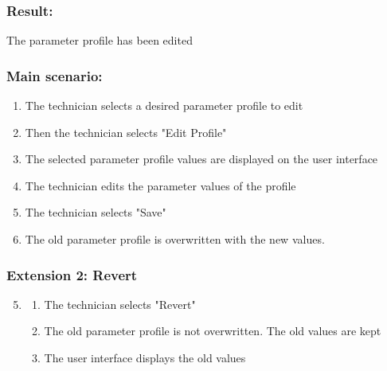 \begin{framed}
\subsubsection*{Result:}
The parameter profile has been edited

\subsubsection*{Main scenario:}
\begin{enumerate}
	\item The technician selects a desired parameter profile to edit
	\item Then the technician selects "Edit Profile"
	\item The selected parameter profile values are displayed on the user interface
	\item The technician edits the parameter values of the profile
	\item The technician selects "Save"
	\item The old parameter profile is overwritten with the new values.
\end{enumerate}	

\subsubsection*{Extension 2: Revert}
\begin{enumerate}
	\setcounter{enumi}{4}
	\item 
	\begin{enumerate}
		\item The technician selects "Revert"
		\item The old parameter profile is not overwritten. The old values are kept
		\item The user interface displays the old values
	\end{enumerate}
\end{enumerate}
\end{framed}

